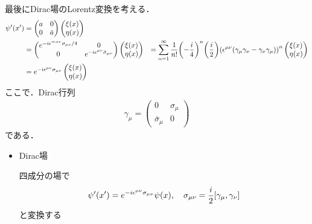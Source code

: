 最後にDirac場のLorentz変換を考える．
\begin{align}
		\psi'(x')
		&= \begin{pmatrix}
				a & 0\\
				0 & \bar{a}
		\end{pmatrix}
		\begin{pmatrix}
				\xi(x)\\
				\eta(x)
		\end{pmatrix}\\
		&=
		\begin{pmatrix}
				e^{-i\epsilon^{mu\nu}\sigma_{\mu\nu}/4} & 0\\
				0 & e^{-i\epsilon^{\mu\nu}\bar{\sigma}_{\mu\nu}}
		\end{pmatrix}
		\begin{pmatrix}
				\xi(x)\\
				\eta(x)
		\end{pmatrix}
		&= \sum_{n = 1}^{\infty} \frac{1}{n!}\qty(-\frac{i}{4})^n\qty(\frac{i}{2})\qty(\epsilon^{\mu\nu}\qty(\gamma_{\mu}\gamma_{\nu} - \gamma_{\nu}\gamma_{\mu}))^n
		\begin{pmatrix}
				\xi(x)\\
				\eta(x)
		\end{pmatrix}
		\\
		&= e^{-i\epsilon^{\mu\nu}\sigma_{\mu\nu}}
		\begin{pmatrix}
				\xi(x)\\
				\eta(x)
		\end{pmatrix}
\end{align}
ここで．Dirac行列
\begin{align}
		\gamma_{\mu} = 
		\begin{pmatrix}
				0 & \sigma_{\mu}\\
				\bar{\sigma}_{\mu} & 0
		\end{pmatrix}
\end{align}
である．

\begin{itemize}
		\item Dirac場

				四成分の場で
				\begin{align}
						\psi'(x') = e^{-i\epsilon^{\mu\nu}\sigma_{\mu\nu}}\psi(x), \quad \sigma_{\mu\nu} = \frac{i}{2}\qty[\gamma_{\mu}, \gamma_{\nu}]
				\end{align}
				と変換する
\end{itemize}








